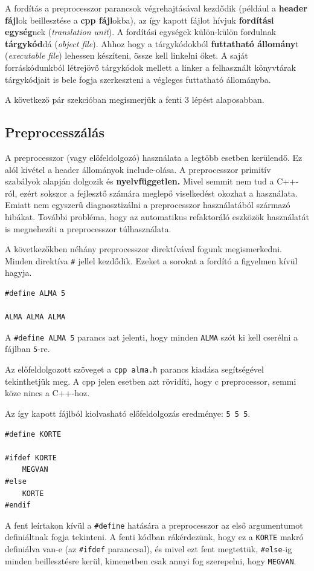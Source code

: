 \documentclass[a4paper,11.5pt,table]{article}
\begin{document}
	A fordítás a preprocesszor parancsok végrehajtásával kezdődik (például a \textbf{header fájl}ok beillesztése a \textbf{cpp fájl}okba), az így kapott fájlot hívjuk \textbf{fordítási egység}nek (\textit{translation unit}). A fordítási egységek külön-külön fordulnak \textbf{tárgykód}dá (\textit{object file}). Ahhoz hogy a tárgykódokból \textbf{futtatható állomány}t (\textit{executable file}) lehessen készíteni, össze kell linkelni őket. A saját forráskódunkból létrejövő tárgykódok mellett a linker a felhasznált könyvtárak tárgykódjait is bele fogja szerkeszteni a végleges futtatható állományba.
	\medskip
	
	A következő pár szekcióban megismerjük a fenti 3 lépést alaposabban.
	
	\subsection{Preprocesszálás}
	A preprocesszor (vagy előfeldolgozó) használata a legtöbb esetben kerülendő. Ez alól kivétel a header állományok include-olása. A preprocesszor primitív szabályok alapján dolgozik és \textbf{nyelvfüggetlen.} Mivel semmit nem tud a C++-ról, ezért sokszor a fejlesztő számára meglepő viselkedést okozhat a használata. Emiatt nem egyszerű diagnosztizálni a preprocesszor használatából származó hibákat. További probléma, hogy az automatikus refaktoráló eszközök használatát is megnehezíti a preprocesszor túlhasználata.
	
	A következőkben néhány preprocesszor direktívával fogunk megismerkedni. Minden direktíva \texttt{\#} jellel kezdődik. Ezeket a sorokat a fordító a figyelmen kívül hagyja.
  \bigskip
	
	\begin{lstlisting}
#define ALMA 5

ALMA ALMA ALMA
	\end{lstlisting}
	A \texttt{\#define ALMA 5}  parancs azt jelenti, hogy minden \texttt{ALMA} szót ki kell cserélni a fájlban \texttt{5}-re.
	
	Az előfeldolgozott szöveget a \texttt{cpp alma.h} parancs kiadása segítségével tekinthetjük meg. A cpp jelen esetben azt rövidíti, hogy c preprocessor, semmi köze nincs a C++-hoz.
	
	Az így kapott fájlból kiolvasható előfeldolgozás eredménye: \texttt{5 5 5}.
	\bigskip
	
	\begin{lstlisting}
#define KORTE

#ifdef KORTE
	MEGVAN
#else
	KORTE
#endif
	\end{lstlisting}
	A fent leírtakon kívül a \texttt{\#define} hatására a preprocesszor az első argumentumot definiáltnak fogja tekinteni. A fenti kódban rákérdezünk, hogy ez a \texttt{KORTE} makró definiálva van-e (az \texttt{\#ifdef} paranccsal), és mivel ezt fent megtettük, \texttt{\#else}-ig minden beillesztésre kerül, kimenetben csak annyi fog szerepelni, hogy \texttt{MEGVAN}.
	\bigskip
	
\end{document}
